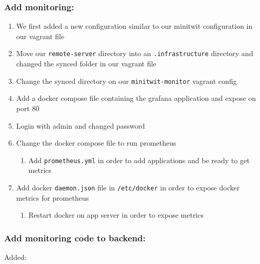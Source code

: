 \subsubsection{Add monitoring:}
\label{log:add-monitoring}

\begin{enumerate}
    \item We first added a new configuration similar to our minitwit configuration in our vagrant file
    \item Move our \texttt{remote-server} directory into an \texttt{.infrastructure} directory and changed the synced folder in our vagrant file
    \item Change the synced directory on our \texttt{minitwit-monitor} vagrant config
    \item Add a docker compose file containing the grafana application and expose on port 80
    \item Login with admin and changed password
    \item Change the docker compose file to run prometheus
    \begin{enumerate}
        \item Add \texttt{prometheus.yml} in order to add applications and be ready to get metrics
    \end{enumerate}

    \item Add docker \texttt{daemon.json} file in \texttt{/etc/docker} in order to expose docker metrics for prometheus

    \begin{enumerate}
        \item Restart docker on app server in order to expose metrics
    \end{enumerate}
\end{enumerate}

\subsubsection{Add monitoring code to backend:}
\label{log:add-monitoring-code-to-backend}

Added:


